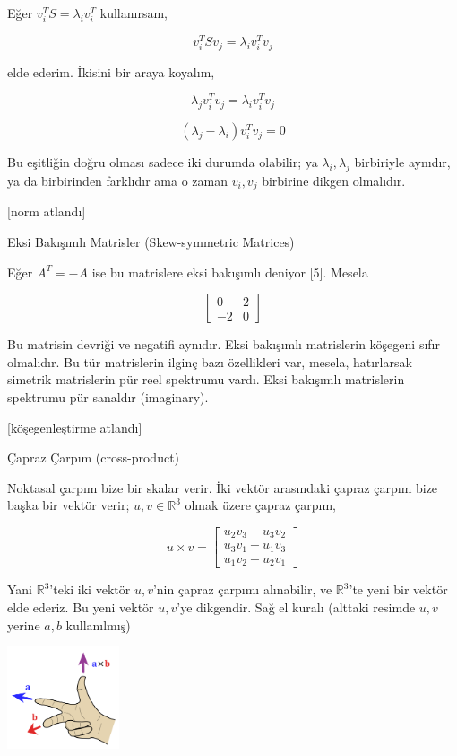 \documentclass[12pt,fleqn]{article}\usepackage{../../common}
\begin{document}
Eğer  $v_i^TS = \lambda_i v_i^T$ kullanırsam,

$$ v_i^T S v_j  = \lambda_i v_i^T v_j $$

elde ederim. İkisini bir araya koyalım,

$$ \lambda_j v_i^T v_j =  \lambda_i v_i^T v_j $$

$$ (\lambda_j-\lambda_i) v_i^T v_j = 0$$

Bu eşitliğin doğru olması sadece iki durumda olabilir; ya
$\lambda_i,\lambda_j$ birbiriyle aynıdır, ya da birbirinden farklıdır ama
o zaman  $v_i,v_j$ birbirine dikgen olmalıdır. 

[norm atlandı]

Eksi Bakışımlı Matrisler (Skew-symmetric Matrices)

Eğer $A^T = -A$ ise bu matrislere eksi bakışımlı deniyor [5]. Mesela

$$ 
\left[\begin{array}{rr}
0 & 2 \\ -2 & 0
\end{array}\right]
 $$

Bu matrisin devriği ve negatifi aynıdır. Eksi bakışımlı matrislerin
köşegeni sıfır olmalıdır. Bu tür matrislerin ilginç bazı özellikleri var,
mesela, hatırlarsak simetrik matrislerin pür reel spektrumu vardı. Eksi
bakışımlı matrislerin spektrumu pür sanaldır (imaginary).

[köşegenleştirme atlandı]

Çapraz Çarpım (cross-product) 

Noktasal çarpım bize bir skalar verir. İki vektör arasındaki çapraz çarpım
bize başka bir vektör verir; $u,v \in \mathbb{R}^3$ olmak üzere çapraz çarpım,

$$ 
u \times v = 
\left[\begin{array}{r}
u_2v_3 - u_3v_2 \\
u_3v_1 - u_1v_3 \\
u_1v_2 - u_2v_1 
\end{array}\right]
$$

Yani $\mathbb{R}^3$'teki iki vektör $u,v$'nin çapraz çarpımı alınabilir, ve
$\mathbb{R}^3$'te yeni bir vektör elde ederiz. Bu yeni vektör $u,v$'ye
dikgendir. Sağ el kuralı (alttaki resimde $u,v$ yerine $a,b$ kullanılmış)

\includegraphics[height=3cm]{righthand.png}
\end{document}
